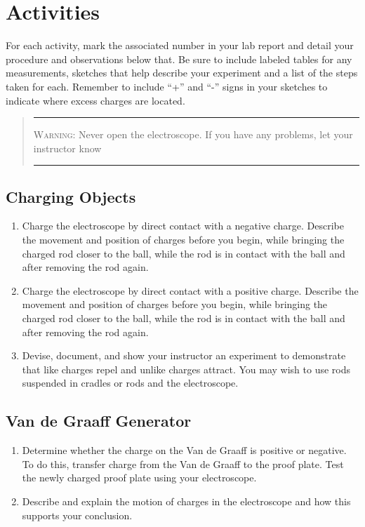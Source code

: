 \section{Activities}
For each activity, mark the associated number in your lab report and detail your procedure and observations below that.  Be sure to include labeled tables for any measurements, sketches that help describe your experiment and a list of the steps taken for each.  Remember to include ``+'' and ``-'' signs in your sketches to indicate where excess charges are located. 

\begin{quote}\hrule
\textsc{Warning:} Never open the electroscope.  If you have any problems, let your instructor know
\vspace{7pt}
\hrule
\end{quote}

\subsection{Charging Objects}
\begin{enumerate}
	 \item Charge the electroscope by direct contact with a negative charge.  Describe the movement and position of charges before you begin, while bringing the charged rod closer to the ball, while the rod is in contact with the ball and after removing the rod again.
	 \item Charge the electroscope by direct contact with a positive charge.  Describe the movement and position of charges before you begin, while bringing the charged rod closer to the ball, while the rod is in contact with the ball and after removing the rod again.
	 \item  Devise, document, and show your instructor an experiment to demonstrate that like charges repel and unlike charges attract.  You may wish to use rods suspended in cradles or rods and the electroscope.
\end{enumerate}

\subsection{Van de Graaff Generator}
\begin{enumerate}[resume]
	 \item Determine whether the charge on the Van de Graaff is positive or negative.  To do this, transfer charge from the Van de Graaff to the proof plate.  Test the newly charged proof plate using your electroscope.  
	 \item Describe and explain the motion of charges in the electroscope and how this supports your conclusion.
\end{enumerate}

